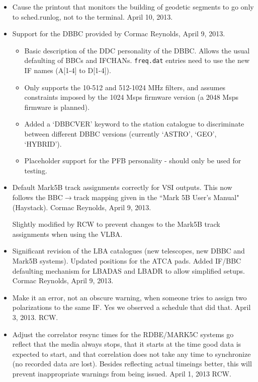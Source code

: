 \documentclass{report}
\begin{document}
\begin{itemize}
\item Cause the printout that monitors the building of geodetic 
segments to go only to sched.runlog, not to the terminal.
April 10, 2013.

\item Support for the DBBC provided by Cormac Reynolds, April 9, 2013.  
    \begin{itemize}
        \item Basic description of the DDC personality of the DBBC.
        Allows the usual defaulting of BBCs and IFCHANs. {\tt freq.dat}
        entries need to use the new IF names (A[1-4] to D[1-4]). 

        \item Only supports the 10-512 and 512-1024 MHz filters, and
        assumes constraints imposed by the 1024 Msps firmware version (a
        2048 Msps firmware is planned).

        \item Added a `DBBCVER' keyword to the station catalogue to
        discriminate between different DBBC versions (currently `ASTRO',
        `GEO', `HYBRID').

        \item Placeholder support for the PFB personality - should only
        be used for testing. 
    \end{itemize}

\item Default Mark5B track assignments correctly for VSI outputs. This
now follows the BBC$\rightarrow$track mapping given in the ``Mark 5B
User's Manual" (Haystack). Cormac Reynolds, April 9, 2013.

Slightly modified by RCW to prevent changes to the Mark5B track
assignments when using the VLBA. 

\item Significant revision of the LBA catalogues (new telescopes, new
DBBC and Mark5B systems). Updated positions for the ATCA pads. Added
IF/BBC defaulting mechanism for LBADAS and LBADR to allow simplified
setups. Cormac Reynolds, April 9, 2013.

\item Make it an error, not an obscure warning, when someone tries to
assign two polarizations to the same IF.  Yes we observed a schedule
that did that.  April 3, 2013.  RCW.

\item Adjust the correlator resync times for the RDBE/MARK5C systems
go reflect that the media always stops, that it starts at the 
time good data is expected to start, and that correlation does not
take any time to synchronize (no recorded data are lost).  Besides
reflecting actual timeings better, this will prevent inappropriate
warnings from being issued.  April 1, 2013  RCW.


\end{itemize}
\end{document}
